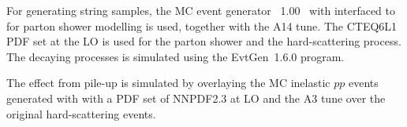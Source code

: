 For generating string samples, the MC event
generator \str~1.00~\cite{Vakilipourtakalou:2018pfo} 
with interfaced to  for parton shower modelling is used, together with the A14 tune.%
The CTEQ6L1~\cite{Pumplin:2002vw} PDF set at the LO is used for the parton shower and the hard-scattering process. The decaying processes is simulated using the EvtGen~1.6.0 program.

The effect from pile-up is simulated by overlaying the MC inelastic $pp$
events generated with  with a PDF set of NNPDF2.3 at LO and the A3 tune over the original hard-scattering events. 


\FloatBarrier

